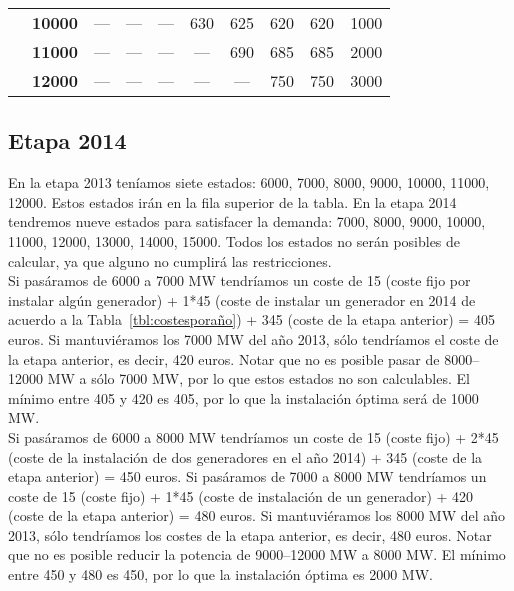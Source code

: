 \documentclass[12pt,a4paper,twoside,openright,titlepage,final]{article}
\begin{document}
\begin{table}[htbp!]
{\begin{tabular}{|cccccccccc|}
\multicolumn{1}{|c|}{}                               & \textbf{10000}        & ---           & ---           & ---           & 630           & 625           & 620           & 620                                                                 & 1000                                                                  \\
\multicolumn{1}{|c|}{}                               & \textbf{11000}        & ---           & ---           & ---           & ---           & 690           & 685           & 685                                                                 & 2000                                                                  \\
\multicolumn{1}{|c|}{}                               & \textbf{12000}        & ---           & ---           & ---           & ---           & ---           & 750           & 750                                                                 & 3000                                                                  \\ \hline
\end{tabular}
}
\end{table}



\subsection{Etapa 2014}

En la etapa 2013 teníamos siete estados: 6000, 7000, 8000, 9000, 10000, 11000, 12000. Estos estados irán en la fila superior de la tabla. En la etapa 2014 tendremos nueve estados para satisfacer la demanda: 7000, 8000, 9000, 10000, 11000, 12000, 13000, 14000, 15000. Todos los estados no serán posibles de calcular, ya que alguno no cumplirá las restricciones.\\

Si pasáramos de 6000 a 7000 MW tendríamos un coste de 15 (coste fijo por instalar algún generador) + 1*45 (coste de instalar un generador en 2014 de acuerdo a la Tabla~\ref{tbl:costesporaño}) + 345 (coste de la etapa anterior) = 405 euros. Si mantuviéramos los 7000 MW del año 2013, sólo tendríamos el coste de la etapa anterior, es decir, 420 euros. Notar que no es posible pasar de 8000--12000 MW a sólo 7000 MW, por lo que estos estados no son calculables. El mínimo entre 405 y 420 es 405, por lo que la instalación óptima será de 1000 MW.\\

Si pasáramos de 6000 a 8000 MW tendríamos un coste de 15 (coste fijo) + 2*45 (coste de la instalación de dos generadores en el año 2014) + 345 (coste de la etapa anterior) = 450 euros. Si pasáramos de 7000 a  8000 MW tendríamos un coste de 15 (coste fijo) + 1*45 (coste de instalación de un generador) + 420 (coste de la etapa anterior) = 480 euros. Si mantuviéramos los 8000 MW del año 2013, sólo tendríamos los costes de la etapa anterior, es decir, 480 euros. Notar que no es posible reducir la potencia de 9000--12000 MW a 8000 MW. El mínimo entre 450 y 480 es 450, por lo que la instalación óptima es 2000 MW.\\
\end{document}

